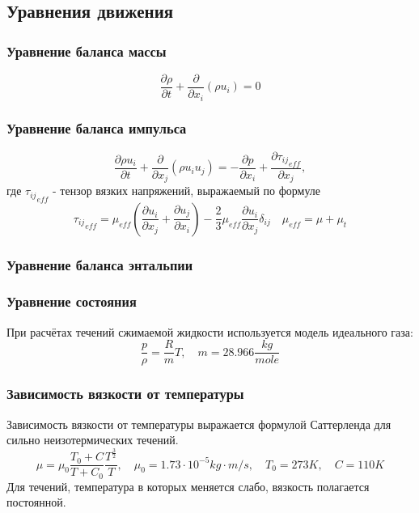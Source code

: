 \subsection{Уравнения движения}
		\subsubsection{Уравнение баланса массы}
			\begin{equation}
				\frac{\partial \rho}{\partial t} + \frac{\partial}{\partial x_i}(\rho u_i) = 0
			\end{equation}
		\subsubsection{Уравнение баланса импульса}
			\begin{equation}
				\frac{\partial \rho u_i}{\partial t} + \frac{\partial}{\partial x_j}(\rho u_iu_j) = - \frac{\partial p}{\partial x_i} + \frac{\partial {\tau_{ij}}_{eff}}{\partial x_j},
			\end{equation}
			где ${\tau_{ij}}_{eff}$ - тензор вязких напряжений, выражаемый по формуле
			\begin{equation}
				{\tau_{ij}}_{eff} = \mu_{eff}\left( \frac{\partial u_i}{\partial x_j} + \frac{\partial u_j}{\partial x_i} \right) - \frac{2}{3}\mu_{eff}\frac{\partial u_i}{\partial x_j} \delta_{ij} \quad \mu_{eff} = \mu + \mu_{t}
			\end{equation}
		\subsubsection{Уравнение баланса энтальпии}
		\subsubsection{Уравнение состояния}
			\hspace{2em}При расчётах течений сжимаемой жидкости используется модель идеального газа:
			\begin{equation}
				\frac{p}{\rho} = \frac{R}{m}T, \quad m = 28.966 \frac{kg}{mole}
			\end{equation}
			\subsubsection{Зависимость вязкости от температуры}
				\hspace{2em}Зависимость вязкости от температуры выражается формулой Саттерленда для сильно неизотермических течений.
				\begin{equation}
					\mu = \mu_0 \frac{T_0 + C}{T + C_0} \frac{T^{\frac{3}{2}}}{T}, \quad \mu_0 = 1.73 \cdot 10^{-5} kg \cdot m/s, \quad T_0 = 273K, \quad C=110 K
				\end{equation}
				Для течений, температура в которых меняется слабо, вязкость полагается постоянной.

